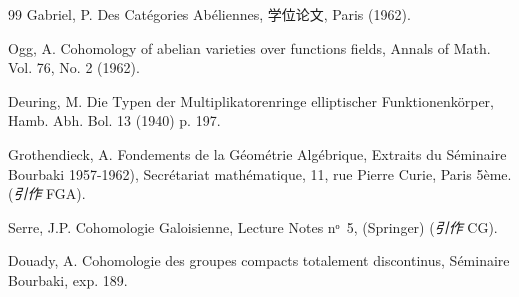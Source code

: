 \begin{thebibliography}{99}
 Gabriel, P. Des Catégories Abéliennes,
学位论文, Paris (1962).

 Ogg, A. Cohomology of abelian varieties over
functions fields, Annals of Math. Vol. 76, No. 2 (1962).

 Deuring, M. Die Typen der Multiplikatorenringe elliptischer
Funktionenkörper, Hamb. Abh. Bol. 13 (1940) p. 197.

 Grothendieck, A. Fondements de la Géométrie
Algébrique, Extraits du Séminaire Bourbaki 1957-1962), Secrétariat
mathématique, 11, rue Pierre Curie, Paris 5ème. (\emph{引作} FGA).

 Serre, J.P. Cohomologie Galoisienne, Lecture Notes
nᵒ 5, (Springer) (\emph{引作} CG).

 Douady, A. Cohomologie des groupes compacts
totalement discontinus, Séminaire Bourbaki, exp. 189.
\end{thebibliography}

\ifx\danslelivre\undefined

\fi



